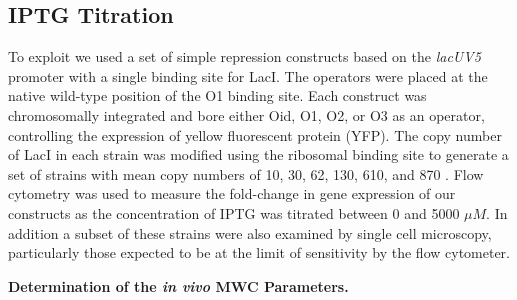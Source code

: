 \pagebreak
\subsection*{IPTG Titration}


To exploit \eref[eq7] we used a set of simple repression constructs based on the
\textit{lacUV5} promoter with a single binding site for LacI. The
operators were placed at the native wild-type position of the O1 binding site.
Each construct was chromosomally integrated and bore either Oid, O1, O2, or O3
as an operator, controlling the expression of yellow fluorescent protein (YFP).
The copy number of LacI in each strain was modified using the ribosomal
binding site to generate a set of strains with mean copy numbers of 10, 30, 62,
130, 610, and 870 \cite{Garcia2011}. Flow cytometry was used
to measure the fold-change in gene expression of our constructs as the
concentration of IPTG was titrated between 0 and 5000 $\mu M$. In addition a
subset of these strains were also examined by single cell microscopy,
particularly those expected to be at the limit of sensitivity by the flow
cytometer. 

\noindent \textbf{Determination of the \textit{in vivo} MWC Parameters.}

